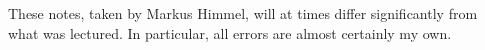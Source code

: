 

\maketitle

These notes, taken by Markus Himmel, will at times differ significantly from
what was lectured. In particular, all errors are almost certainly my own.

\tableofcontents


